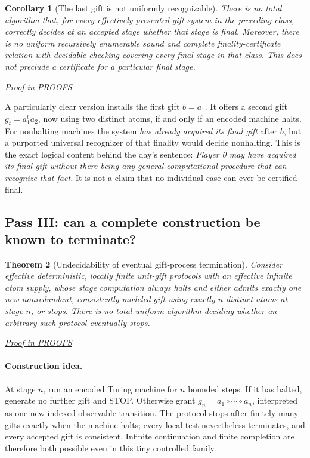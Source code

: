 \documentclass[11pt,letterpaper]{article}
\newtheorem{theorem}{Theorem}[section]
\newtheorem{corollary}[theorem]{Corollary}
\theoremstyle{definition}\newtheorem{definition}[theorem]{Definition}\newtheorem{example}[theorem]{Example}
\theoremstyle{remark}\newtheorem{remark}[theorem]{Remark}
\newcommand{\proofat}[1]{\par\smallskip\noindent\hfill\textit{\hyperref[#1]{Proof in PROOFS}}}
\begin{document}
\begin{corollary}[The last gift is not uniformly recognizable]\label{w0:cor:last}
There is no total algorithm that, for every effectively presented gift system in the preceding class, correctly decides at an accepted stage whether that stage is final. Moreover, there is no uniform recursively enumerable \emph{sound and complete finality-certificate relation with decidable checking} covering every final stage in that class. This does not preclude a certificate for a particular final stage.\proofat{w0:pr:last}
\end{corollary}

A particularly clear version installs the first gift $b=a_1$. It offers a second gift $g_t=a_1^t a_2$, now using two distinct atoms, if and only if an encoded machine halts. For nonhalting machines the system \emph{has already acquired its final gift} after $b$, but a purported universal recognizer of that finality would decide nonhalting. This is the exact logical content behind the day's sentence: \emph{Player 0 may have acquired its final gift without there being any general computational procedure that can recognize that fact.} It is not a claim that no individual case can ever be certified final.

\subsection{Pass III: can a complete construction be known to terminate?}
\begin{theorem}[Undecidability of eventual gift-process termination]\label{w0:thm:stop}
Consider effective deterministic, locally finite unit-gift protocols with an effective infinite atom supply, whose stage computation always halts and either admits exactly one new nonredundant, consistently modeled gift using exactly $n$ distinct atoms at stage $n$, or stops. There is no total uniform algorithm deciding whether an arbitrary such protocol eventually stops.\proofat{w0:pr:stop}
\end{theorem}

\paragraph{Construction idea.} At stage $n$, run an encoded Turing machine for $n$ bounded steps. If it has halted, generate no further gift and STOP. Otherwise grant $g_n=a_1\circ\cdots\circ a_n$, interpreted as one new indexed observable transition. The protocol stops after finitely many gifts exactly when the machine halts; every local test nevertheless terminates, and every accepted gift is consistent. Infinite continuation and finite completion are therefore both possible even in this tiny controlled family.
\end{document}
